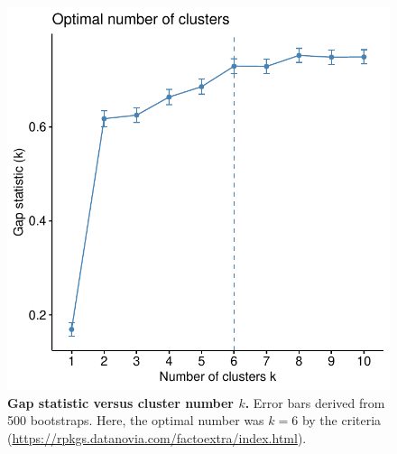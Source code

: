 \begin{figure}
    \centering
    \includegraphics[width=1.0\textwidth,page=1]{mainmatter/figures/chapter_04/plot_gene_set_enrichment.spline_fviz_nbclust_gap_stat.pdf}
    \caption{
        \textbf{Gap statistic versus cluster number $k$.}
        Error bars derived from 500 bootstraps. 
        Here, the optimal number was $k=6$ by the   criteria (\url{https://rpkgs.datanovia.com/factoextra/index.html}).
    }
    \label{fig:multipants_dge_spline_fviz_nbclust_gap_stat}
\end{figure}

